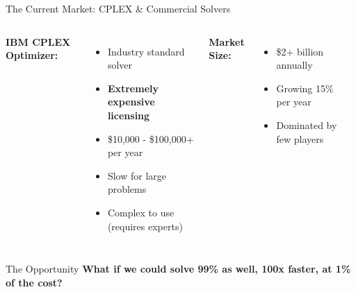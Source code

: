 \documentclass[aspectratio=169]{beamer}
\begin{document}
\begin{frame}{The Current Market: CPLEX \& Commercial Solvers}
\begin{columns}
\textbf{IBM CPLEX Optimizer:}
\begin{itemize}
    \item Industry standard solver
    \item \textcolor{aired}{\textbf{Extremely expensive licensing}}
    \item \$10,000 - \$100,000+ per year
    \item Slow for large problems
    \item Complex to use (requires experts)
\end{itemize}

\vspace{0.3cm}
\textbf{Market Size:}
\begin{itemize}
    \item \$2+ billion annually
    \item Growing 15\% per year
    \item Dominated by few players
\end{itemize}

\begin{center}
\end{center}
\end{columns}

\vspace{0.5cm}
\begin{block}{The Opportunity}
\textbf{What if we could solve 99\% as well, 100x faster, at 1\% of the cost?}
\end{block}
\end{frame}
\end{document}
